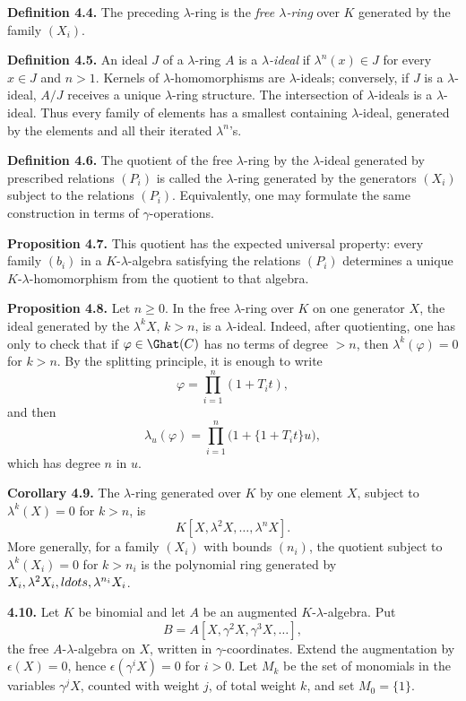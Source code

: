 \textbf{Definition 4.4.} The preceding \(\lambda\)-ring is the \emph{free \(\lambda\)-ring} over \(K\) generated by the family \((X_i)\).

\textbf{Definition 4.5.} An ideal \(J\) of a \(\lambda\)-ring \(A\) is a \emph{\(\lambda\)-ideal} if \(\lambda^n(x)\in J\) for every \(x\in J\) and \(n>1\). Kernels of \(\lambda\)-homomorphisms are \(\lambda\)-ideals; conversely, if \(J\) is a \(\lambda\)-ideal, \(A/J\) receives a unique \(\lambda\)-ring structure. The intersection of \(\lambda\)-ideals is a \(\lambda\)-ideal. Thus every family of elements has a smallest containing \(\lambda\)-ideal, generated by the elements and all their iterated \(\lambda^n\)'s.

\textbf{Definition 4.6.} The quotient of the free \(\lambda\)-ring by the \(\lambda\)-ideal generated by prescribed relations \((P_i)\) is called the \(\lambda\)-ring generated by the generators \((X_i)\) subject to the relations \((P_i)\). Equivalently, one may formulate the same construction in terms of \(\gamma\)-operations.

\textbf{Proposition 4.7.} This quotient has the expected universal property: every family \((b_i)\) in a \(K\)-\(\lambda\)-algebra satisfying the relations \((P_i)\) determines a unique \(K\)-\(\lambda\)-homomorphism from the quotient to that algebra.

\textbf{Proposition 4.8.} Let \(n\ge0\). In the free \(\lambda\)-ring over \(K\) on one generator \(X\), the ideal generated by the \(\lambda^kX\), \(k>n\), is a \(\lambda\)-ideal. Indeed, after quotienting, one has only to check that if \(\varphi\in\Ghat(C)\) has no terms of degree \(>n\), then \(\lambda^k(\varphi)=0\) for \(k>n\). By the splitting principle, it is enough to write
\[
  \varphi=\prod_{i=1}^{n}(1+T_it),
\]
and then
\[
  \lambda_u(\varphi)=\prod_{i=1}^{n}\bigl(1+\{1+T_it\}u\bigr),
\]
which has degree \(n\) in \(u\).

\textbf{Corollary 4.9.} The \(\lambda\)-ring generated over \(K\) by one element \(X\), subject to \(\lambda^k(X)=0\) for \(k>n\), is
\[
  K[X,\lambda^2X,\ldots,\lambda^nX].
\]
More generally, for a family \((X_i)\) with bounds \((n_i)\), the quotient subject to \(\lambda^k(X_i)=0\) for \(k>n_i\) is the polynomial ring generated by \(X_i,\lambda^2X_i,\\ldots,\lambda^{n_i}X_i\).

\textbf{4.10.} Let \(K\) be binomial and let \(A\) be an augmented \(K\)-\(\lambda\)-algebra. Put
\[
  B=A[X,\gamma^2X,\gamma^3X,\ldots],
\]
the free \(A\)-\(\lambda\)-algebra on \(X\), written in \(\gamma\)-coordinates. Extend the augmentation by \(\epsilon(X)=0\), hence \(\epsilon(\gamma^iX)=0\) for \(i>0\). Let \(M_k\) be the set of monomials in the variables \(\gamma^jX\), counted with weight \(j\), of total weight \(k\), and set \(M_0=\{1\}\).

